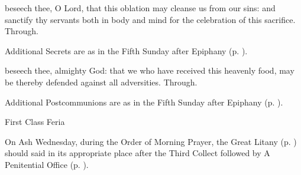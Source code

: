 \secret
{} beseech thee, O Lord, that this oblation may cleanse us from our sins: and sanctify thy servants both in body and mind for the celebration of this sacrifice. Through.
\begin{rubric}
    Additional Secrets are as in the Fifth Sunday after Epiphany (p. \pageref{EpiphanyV}).
\end{rubric}
\postcommunion
{} beseech thee, almighty God: that we who have received this heavenly food, may be thereby defended against all adversities. Through.
\begin{rubric}
    Additional Postcommunions are as in the Fifth Sunday after Epiphany (p. \pageref{EpiphanyV}).
\end{rubric}
\clearpage
{}
\begin{inhead}
{First Class Feria}
\end{inhead}
\par\noindent
\begin{rubric}
    On Ash Wednesday, during the Order of Morning Prayer, the Great Litany (p. \pageref{litany}) should said in its appropriate place after the Third Collect followed by A Penitential Office (p. \pageref{penitential}).
\end{rubric}

